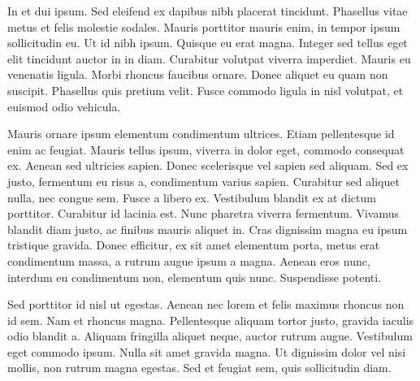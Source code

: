 In et dui ipsum. Sed eleifend ex dapibus nibh placerat tincidunt. Phasellus vitae metus et felis molestie sodales. Mauris porttitor mauris enim, in tempor ipsum sollicitudin eu. Ut id nibh ipsum. Quisque eu erat magna. Integer sed tellus eget elit tincidunt auctor in in diam. Curabitur volutpat viverra imperdiet. Mauris eu venenatis ligula. Morbi rhoncus faucibus ornare. Donec aliquet eu quam non suscipit. Phasellus quis pretium velit. Fusce commodo ligula in nisl volutpat, et euismod odio vehicula.

Mauris ornare ipsum elementum condimentum ultrices. Etiam pellentesque id enim ac feugiat. Mauris tellus ipsum, viverra in dolor eget, commodo consequat ex. Aenean sed ultricies sapien. Donec scelerisque vel sapien sed aliquam. Sed ex justo, fermentum eu risus a, condimentum varius sapien. Curabitur sed aliquet nulla, nec congue sem. Fusce a libero ex. Vestibulum blandit ex at dictum porttitor. Curabitur id lacinia est. Nunc pharetra viverra fermentum. Vivamus blandit diam justo, ac finibus mauris aliquet in. Cras dignissim magna eu ipsum tristique gravida. Donec efficitur, ex sit amet elementum porta, metus erat condimentum massa, a rutrum augue ipsum a magna. Aenean eros nunc, interdum eu condimentum non, elementum quis nunc. Suspendisse potenti.

Sed porttitor id nisl ut egestas. Aenean nec lorem et felis maximus rhoncus non id sem. Nam et rhoncus magna. Pellentesque aliquam tortor justo, gravida iaculis odio blandit a. Aliquam fringilla aliquet neque, auctor rutrum augue. Vestibulum eget commodo ipsum. Nulla sit amet gravida magna. Ut dignissim dolor vel nisi mollis, non rutrum magna egestas. Sed et feugiat sem, quis sollicitudin diam.

